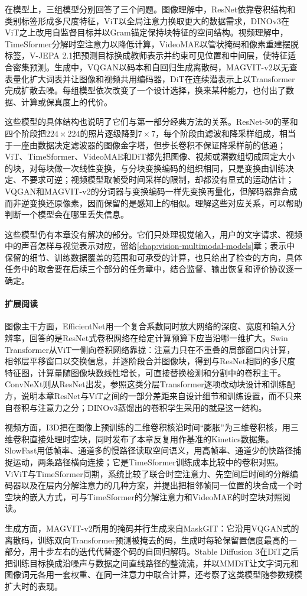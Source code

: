 在模型上，三组模型分别回答了三个问题。图像理解中，ResNet依靠卷积结构和类别标签形成多尺度特征，ViT以全局注意力换取更大的数据需求，DINOv3在ViT之上改用自监督目标并以Gram锚定保持块特征的空间结构。视频理解中，TimeSformer分解时空注意力以降低计算，VideoMAE以管状掩码和像素重建摆脱标签，V-JEPA 2.1把预测目标换成教师表示并约束可见位置和中间层，使特征适合密集预测。生成中，VQGAN以码本和自回归生成离散码，MAGVIT-v2以无查表量化扩大词表并让图像和视频共用编码器，DiT在连续潜表示上以Transformer完成扩散去噪。每组模型依次改变了一个设计选择，换来某种能力，也付出了数据、计算或保真度上的代价。

这些模型的具体结构也说明了它们与第一部分经典方法的关系。ResNet-50的茎和四个阶段把$224\times224$的照片逐级降到$7\times7$，每个阶段由滤波和降采样组成，相当于一座由数据决定滤波器的图像金字塔，但步长卷积不保证降采样前的低通；ViT、TimeSformer、VideoMAE和DiT都先把图像、视频或潜数组切成固定大小的块，对每块做一次线性变换，与分块变换编码的组织相同，只是变换由训练决定、不要求可逆；视频模型取帧受时间采样的限制，却都没有显式的运动估计；VQGAN和MAGVIT-v2的分词器与变换编码一样先变换再量化，但解码器靠合成而非逆变换还原像素，因而保留的是感知上的相似。理解这些对应关系，可以帮助判断一个模型会在哪里丢失信息。

这些模型仍有本章没有解决的部分。它们只处理视觉输入，用户的文字请求、视频中的声音怎样与视觉表示对应，留给\ref{chap:vision-multimodal-models}章；表示中保留的细节、训练数据覆盖的范围和可承受的计算，也只给出了检查的方向，具体任务中的取舍要在后续三个部分的任务章中，结合监督、输出恢复和评价协议逐一确定。

\paragraph{扩展阅读}
图像主干方面，EfficientNet用一个复合系数同时放大网络的深度、宽度和输入分辨率，回答的是ResNet式卷积网络在给定计算预算下应当沿哪一维扩大。Swin Transformer从ViT一侧向卷积网络靠拢：注意力只在不重叠的局部窗口内计算，相邻层平移窗口以交换信息，并逐阶段合并图像块，得到与ResNet相同的多尺度特征图，计算量随图像块数线性增长，可直接替换检测和分割中的卷积主干。ConvNeXt则从ResNet出发，参照这类分层Transformer逐项改动块设计和训练配方，说明本章ResNet与ViT之间的一部分差距来自设计细节和训练设置，而不只来自卷积与注意力之分；DINOv3蒸馏出的卷积学生采用的就是这一结构。

视频方面，I3D把在图像上预训练的二维卷积核沿时间“膨胀”为三维卷积核，用三维卷积直接处理时空块，同时发布了本章反复用作基准的Kinetics数据集。SlowFast用低帧率、通道多的慢路径读取空间语义，用高帧率、通道少的快路径捕捉运动，两条路径横向连接；它是TimeSformer训练成本比较中的卷积对照。ViViT与TimeSformer同期，系统比较了联合时空注意力、先空间后时间的分解编码器以及在层内分解注意力的几种方案，并提出把相邻帧同一位置的块合成一个时空块的嵌入方式，可与TimeSformer的分解注意力和VideoMAE的时空块对照阅读。

生成方面，MAGVIT-v2所用的掩码并行生成来自MaskGIT：它沿用VQGAN式的离散码，训练双向Transformer预测被掩去的码，生成时每轮保留置信度最高的一部分，用十步左右的迭代代替逐个码的自回归解码。Stable Diffusion 3在DiT之后把训练目标换成沿噪声与数据之间直线路径的整流流，并以MMDiT让文字词元和图像词元各用一套权重、在同一注意力中联合计算，还考察了这类模型随参数规模扩大时的表现。
